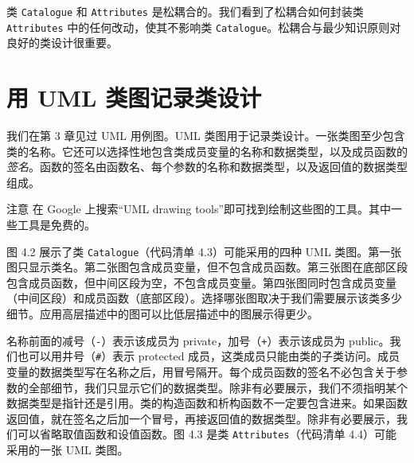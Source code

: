 类 \texttt{Catalogue} 和 \texttt{Attributes} 是松耦合的。我们看到了松耦合如何封装类 \texttt{Attributes} 中的任何改动，使其不影响类 \texttt{Catalogue}。松耦合与最少知识原则对良好的类设计很重要。


\section{用 UML 类图记录类设计}

我们在第 3 章见过 UML 用例图。UML 类图用于记录类设计。一张类图至少包含类的名称。它还可以选择性地包含类成员变量的名称和数据类型，以及成员函数的\emph{签名}。函数的签名由函数名、每个参数的名称和数据类型，以及返回值的数据类型组成。

\begin{myWarning}{注意}
在 Google 上搜索“UML drawing tools”即可找到绘制这些图的工具。其中一些工具是免费的。
\end{myWarning}

图 4.2 展示了类 \texttt{Catalogue}（代码清单 4.3）可能采用的四种 UML 类图。第一张图只显示类名。第二张图包含成员变量，但不包含成员函数。第三张图在底部区段包含成员函数，但中间区段为空，不包含成员变量。第四张图同时包含成员变量（中间区段）和成员函数（底部区段）。选择哪张图取决于我们需要展示该类多少细节。应用高层描述中的图可以比低层描述中的图展示得更少。


名称前面的减号（\texttt{-}）表示该成员为 private，加号（\texttt{+}）表示该成员为 public。我们也可以用井号（\texttt{\#}）表示 protected 成员，这类成员只能由类的子类访问。成员变量的数据类型写在名称之后，用冒号隔开。每个成员函数的签名不必包含关于参数的全部细节，我们只显示它们的数据类型。除非有必要展示，我们不须指明某个数据类型是指针还是引用。类的构造函数和析构函数不一定要包含进来。如果函数返回值，就在签名之后加一个冒号，再接返回值的数据类型。除非有必要展示，我们可以省略取值函数和设值函数。图 4.3 是类 \texttt{Attributes}（代码清单 4.4）可能采用的一张 UML 类图。


